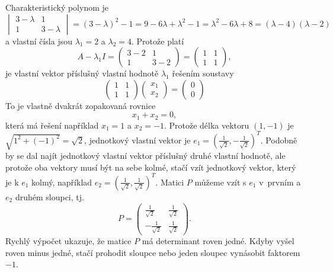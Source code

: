 \reseni
Charakteristický polynom je
\begin{equation*}
  \begin{vmatrix}
    3-\lambda & 1\\1 & 3-\lambda
  \end{vmatrix}
  =(3-\lambda)^2-1=9-6\lambda+\lambda^2-1=\lambda^2-6\lambda+8=(\lambda-4)(\lambda-2)
\end{equation*}
a vlastní čísla jsou $\lambda_1=2$ a $\lambda_2=4$.
Protože platí
\begin{equation*}
A-\lambda_1 I
  =  \begin{pmatrix}
    3-2 & 1 \\
    1 &3-2
  \end{pmatrix}
  =
    \begin{pmatrix}
    1 & 1 \\
    1 &1
  \end{pmatrix},
\end{equation*}
je vlastní vektor příslušný vlastní hodnotě $\lambda_1$ řešením soustavy
\begin{equation*}
\begin{pmatrix}
    1 & 1 \\ 1 &1
  \end{pmatrix}
\begin{pmatrix}
  x_1\\x_2
\end{pmatrix}
=
  \begin{pmatrix}
    0\\0
  \end{pmatrix}
\end{equation*}
To je vlastně dvakrát zopakovaná rovnice
\begin{equation*}
  x_1+x_2=0,
\end{equation*}
která má řešení například $x_1=1$ a $x_2=-1$. Protože délka vektoru $(1,-1)$ je $\sqrt{1^2+(-1)^2}=\sqrt 2$, jednotkový vlastní vektor je $e_1=\left(\frac 1{\sqrt 2}, -\frac 1 {\sqrt 2}\right)^T$. Podobně by se dal najít jednotkový vlastní vektor příslušný druhé vlastní hodnotě, ale protože oba vektory musí být na sebe kolmé, stačí vzít jednotkový vektor, který je k $e_1$ kolmý, například
$e_2=\left(\frac 1{\sqrt 2}, \frac 1 {\sqrt 2}\right)^T$. Matici $P$ můžeme vzít
s $e_1$ v prvním a $e_2$ druhém sloupci, tj.
\begin{equation*}
    P=  \begin{pmatrix}
      \frac 1{\sqrt 2} & \frac 1{\sqrt 2}\\
      -\frac {1}{\sqrt 2} & \frac 1{\sqrt 2}
    \end{pmatrix}.
  \end{equation*}
  Rychlý výpočet ukazuje, že matice $P$ má determinant roven jedné. Kdyby vyšel roven minus jedné, stačí prohodit sloupce nebo jeden sloupec vynásobit faktorem $-1$.
  
